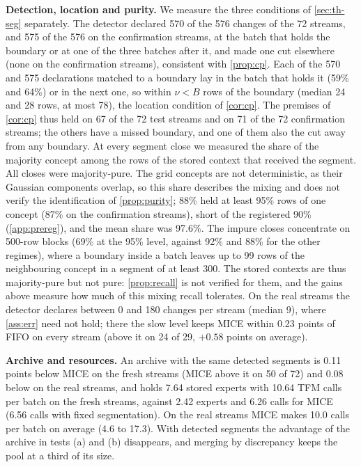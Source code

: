 \documentclass[11pt]{article}
\theoremstyle{plain}
\theoremstyle{definition}
\theoremstyle{remark}
\newcommand{\method}{\textsc{MICE}}   %
\begin{document}
\textbf{Detection, location and purity.} We measure the three conditions of \cref{sec:th-seg} separately. The
detector declared 570 of the 576 changes of the 72 streams, and 575 of the 576 on the confirmation streams, at the
batch that holds the boundary or at one of the three batches after it, and made one cut elsewhere (none on the confirmation streams), consistent
with \cref{prop:cp}. Each of the 570 and 575 declarations matched to a boundary lay in the batch that holds it (59\%
and 64\%) or in the next one, so within $\nu<B$ rows of the boundary (median 24 and 28 rows, at most 78), the
location condition of \cref{cor:cp}. The premises of \cref{cor:cp} thus held on 67 of the 72 test streams and on 71
of the 72 confirmation streams; the others have a missed boundary, and one of them also the cut away from any
boundary. At
every segment close we measured the share of the majority concept among the rows of the stored context that received
the segment. All closes were majority-pure. The grid concepts are not deterministic, as their Gaussian components overlap, so
this share describes the mixing and does not verify the identification of \cref{prop:purity}; 88\%
held at least 95\% rows of one concept (87\% on the confirmation streams), short of the registered 90\%
(\cref{app:prereg}), and the mean share was 97.6\%. The impure closes concentrate on 500-row blocks (69\% at the 95\%
level, against 92\% and 88\% for the other regimes), where a boundary inside a batch leaves up to 99 rows of the
neighbouring concept in a segment of at least 300. The stored contexts are thus majority-pure but not pure:
\cref{prop:recall} is not verified for them, and the gains above measure how much of this mixing recall tolerates.
On the real streams the detector declares between 0 and 180 changes per stream (median 9), where
\cref{ass:err} need not hold; there the slow level keeps \method{} within 0.23 points of FIFO on every stream
(above it on 24 of 29, $+0.58$ points on average).

\textbf{Archive and resources.} An archive with the same detected segments is 0.11 points below \method{} on the
fresh streams (\method{} above it on 50 of 72) and 0.08 below on the real streams, and holds 7.64 stored experts with 10.64 TFM
calls per batch on the fresh streams, against 2.42 experts and 6.26 calls for \method{} (6.56 calls with fixed
segmentation). On the real streams \method{} makes 10.0 calls per batch on average (4.6 to 17.3). With detected
segments the advantage of the archive in tests (a) and (b) disappears, and merging by discrepancy keeps the pool at a
third of its size.
\end{document}
